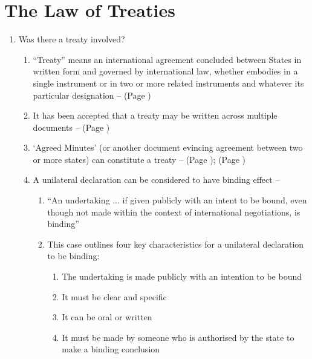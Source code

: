 \section{The Law of Treaties}\label{scaffold:Topic 3}
\begin{enumerate}
    \item Was there a treaty involved?
    \begin{enumerate}
        \item ``Treaty'' means an international agreement concluded between States in written form and governed by international law, whether embodies in a single instrument or in two or more related instruments and whatever its particular designation --  (Page \pageref{VCLT Art 2})
        \item It has been accepted that a treaty may be written across multiple documents --  (Page \pageref{case:Qatar v Bahrain})
        \item `Agreed Minutes' (or another document evincing agreement between two or more states) can constitute a treaty -- (Page \pageref{case:Qatar v Bahrain});  (Page \pageref{case:Bangladesh v Myanmar})
        \item A unilateral declaration can be considered to have binding effect -- 
        \begin{enumerate}
            \item ``An undertaking ... if given publicly with an intent to be bound, even though not made within the context of international negotiations, is binding''
            \item This case outlines four key characteristics for a unilateral declaration to be binding:
            \begin{enumerate}
                \item The undertaking is made publicly with an intention to be bound
                \item It must be clear and specific
                \item It can be oral or written
                \item It must be made by someone who is authorised by the state to make a binding conclusion

\end{enumerate}
\end{enumerate}
\end{enumerate}
\end{enumerate}
